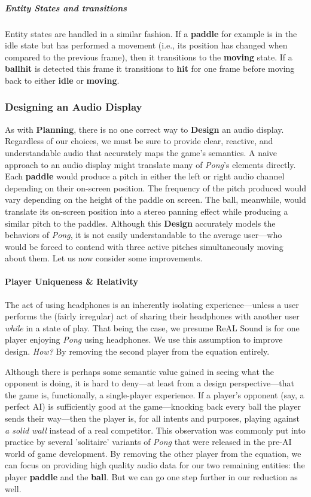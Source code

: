 \documentclass{report}
\newcommand{\rs}{ReAL Sound\xspace}
\newcommand{\plan}{\textbf{Planning}\xspace}
\newcommand{\design}{\textbf{Design}\xspace}
\newcommand{\state}[1]{\textbf{#1}}
\newcommand{\pad}{\textbf{paddle}\xspace}
\newcommand{\ball}{\textbf{ball}\xspace}
\begin{document}
\subparagraph{Entity States and transitions}
Entity states are handled in a similar fashion. If a \pad for example is in the idle state but has performed a movement (i.e., its position has changed when compared to the previous frame), then it transitions to the \state{moving} state. If a \ball \state{hit} is detected this frame it transitions to \state{hit} for one frame before moving back to either \state{idle} or \state{moving}.


\subsubsection{Designing an Audio Display}
As with \plan, there is no one correct way to \design an audio display. Regardless of our choices, we must be sure to provide clear, reactive, and understandable audio that accurately maps the game's semantics. A naive approach to an audio display might translate many of \emph{Pong}'s elements directly. Each \pad would produce a pitch in either the left or right audio channel depending on their on-screen position. The frequency of the pitch produced would vary depending on the height of the paddle on screen. The ball, meanwhile, would translate its on-screen position into a stereo panning effect while producing a similar pitch to the paddles. Although this \design accurately models the behaviors of \emph{Pong}, it is not easily understandable to the average user---who would be forced to contend with three active pitches simultaneously moving about them. Let us now consider some improvements.

\paragraph{Player Uniqueness \& Relativity}
The act of using headphones is an inherently isolating experience---unless a user performs the (fairly irregular) act of sharing their headphones with another user \emph{while} in a state of play. That being the case, we presume \rs is for one player enjoying \emph{Pong} using headphones. We use this assumption to improve design. \emph{How?} By removing the second player from the equation entirely. 

Although there is perhaps some semantic value gained in seeing what the opponent is doing, it is hard to deny---at least from a design perspective---that the game is, functionally, a single-player experience. If a player's opponent (say, a perfect AI) is sufficiently good at the game---knocking back every ball the player sends their way---then the player is, for all intents and purposes, playing against \emph{a solid wall} instead of a real competitor. This observation was commonly put into practice by several 'solitaire' variants of \emph{Pong} that were released in the pre-AI world of game development. By removing the other player from the equation, we can focus on providing high quality audio data for our two remaining entities: the player \pad and the \ball. But we can go one step further in our reduction as well. 
\end{document}
